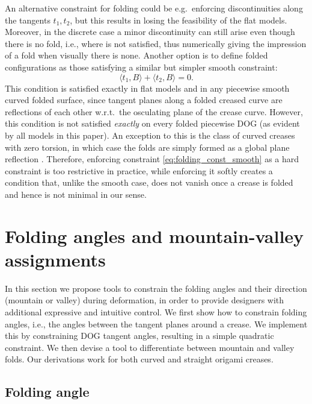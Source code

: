 An alternative constraint for folding could be e.g.\ enforcing discontinuities along the tangents $t_1,t_2$, but this results in losing the feasibility of the flat models. Moreover, in the discrete case a minor discontinuity can still arise even though there is no fold, i.e., where  is not satisfied, thus numerically giving the impression of a fold when visually there is none. Another option is to define folded configurations as those satisfying a similar but simpler smooth constraint:
%
\begin{equation} \label{eq:folding_const_smooth} 
\langle t_1,B\rangle + \langle t_2,B\rangle = 0.
\end{equation}
%
This condition is satisfied exactly in flat models and in any piecewise smooth curved folded surface, since tangent planes along a folded creased curve are reflections of each other w.r.t.\ the osculating plane of the crease curve. However, this condition is not satisfied \emph{exactly} on every folded piecewise DOG (as evident by all models in this paper). An exception to this is the class of curved creases with zero torsion, in which case the folds are simply formed as a global plane reflection \cite{Mitani_ref}. Therefore, enforcing constraint \eqref{eq:folding_const_smooth} as a hard constraint is too restrictive in practice, while enforcing it softly creates a condition that, unlike the smooth case, does not vanish once a crease is folded and hence is not minimal in our sense.


\section{Folding angles and mountain-valley assignments} \label{sec:folding_angles_mountain_valley}

In this section we propose tools to constrain the folding angles and their direction (mountain or valley) during deformation, in order to provide designers with additional expressive and intuitive control. We first show how to constrain folding angles, i.e., the angles between the tangent planes around a crease. We implement this by constraining DOG tangent angles, resulting in a simple quadratic constraint. We then devise a tool to differentiate between mountain and valley folds. Our derivations work for both curved and straight origami creases.

\subsection{Folding angle} 

